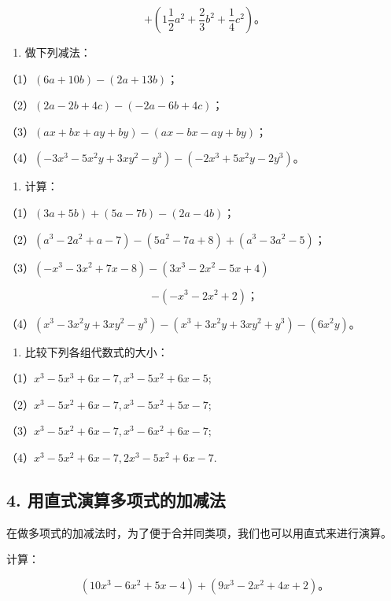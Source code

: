 \[
+ \left(1 \frac{1}{2} a ^{2} + \frac{2}{3} b ^{2} + \frac{1}{4} c ^{2}\right)\text{。}
\]

\begin{enumerate}[start=3]
\item
  做下列减法：
\end{enumerate}

（1）\((6a + 10b) - (2a + 13b)\)；

（2）\((2a - 2b + 4c) - (-2a - 6b + 4c)\)；

（3）\((ax + bx + ay + by) - (ax - bx - ay + by)\)；

（4）\((-3x^{3} - 5x^{2}y + 3xy^{2} - y^{3}) - (-2x^{3} + 5x^{2}y - 2y^{3})\)。

\begin{enumerate}[start=4]
\item
  计算：
\end{enumerate}

（1）\((3a + 5b) + (5a - 7b) - (2a - 4b)\)；

（2）\((a^3 - 2a^2 + a - 7) - (5a^2 - 7a + 8) + (a^3 - 3a^2 - 5)\)；

（3）\((-x^{3} - 3x^{2} + 7x - 8) - (3x^{3} - 2x^{2} - 5x + 4)\)

\[
- (- x ^{3} - 2 x ^{2} + 2)\text{；}
\]

（4）\((x^{3} - 3x^{2}y + 3xy^{2} - y^{3}) - (x^{3} + 3x^{2}y + 3xy^{2} + y^{3}) - (6x^{2}y)\)。

\begin{enumerate}[start=5]
\item
  比较下列各组代数式的大小：
\end{enumerate}

（1）\(x^{3} - 5x^{3} + 6x - 7, x^{3} - 5x^{2} + 6x - 5;\)

（2）\(x^{3} - 5x^{2} + 6x - 7, x^{3} - 5x^{2} + 5x - 7;\)

（3）\(x^{3} - 5x^{2} + 6x - 7, x^{3} - 6x^{2} + 6x - 7;\)

（4）\(x^{3} - 5x^{2} + 6x - 7, 2x^{3} - 5x^{2} + 6x - 7.\)

\subsection{4. 用直式演算多项式的加减法}

在做多项式的加减法时，为了便于合并同类项，我们也可以用直式来进行演算。

 计算：

\[
(10 x ^{3} - 6 x ^{2} + 5 x - 4) + (9 x ^{3} - 2 x ^{2} + 4 x + 2)\text{。}
\]

